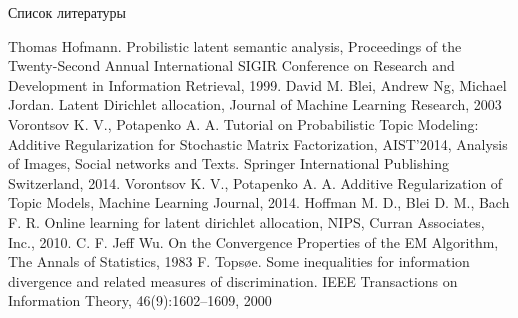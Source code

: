 \documentclass[utf8]{beamer}
\begin{document}
\begin{frame}{Список литературы}
\footnotesize
\begin{thebibliography}{@@@@}
		Thomas Hofmann. Probilistic latent semantic analysis, Proceedings of the Twenty-Second Annual International SIGIR Conference on Research and Development in Information Retrieval, 1999.
		David M. Blei, Andrew Ng, Michael Jordan. Latent Dirichlet allocation, Journal of Machine Learning Research,  2003
		Vorontsov K. V., Potapenko A. A. Tutorial on Probabilistic Topic Modeling: Additive Regularization for Stochastic Matrix Factorization,  AIST’2014, Analysis of Images, Social networks and Texts. Springer International Publishing Switzerland, 2014.
		Vorontsov K. V., Potapenko A. A. Additive Regularization of Topic Models, Machine Learning Journal, 2014.
		Hoffman M. D., Blei D. M., Bach F. R. Online learning for latent dirichlet allocation, NIPS, Curran Associates, Inc., 2010.
		C. F. Jeff Wu. On the Convergence Properties of the EM Algorithm, The Annals of Statistics, 1983
		F. Topsøe. Some inequalities for information divergence and related measures of discrimination. IEEE Transactions on Information Theory, 46(9):1602–1609, 2000
	\end{thebibliography}
\end{frame}
\end{document}
